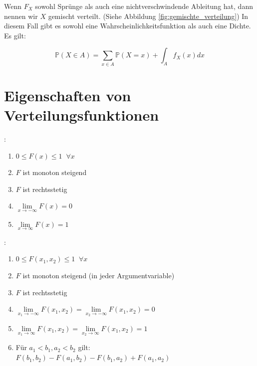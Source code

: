 {    Wenn $F_{X}$ sowohl Sprünge als auch eine nichtverschwindende Ableitung hat, dann nennen wir $X$ gemischt verteilt. (Siehe Abbildung \ref{fig:gemischte_verteilung})
    In diesem Fall gibt es sowohl eine Wahrscheinlichkeitsfunktion als auch eine Dichte. Es gilt:

    \[
    \mathbb P\left(X\in A\right)=\sum _{x\in A}{\mathbb P\left(X=x\right)}+\int_{A}{f_{X}(x)}dx
    \]



    \section{Eigenschaften von Verteilungsfunktionen}

    \begin{definition}:\\
    \label{def:verteilungsfunktion_eigenschaften}
    \begin{enumerate}[1)]
        \item  $0\le F\left(x\right)\le 1\;\;\forall x$
        \item  $F$ ist monoton steigend
        \item $F$ ist rechtsstetig
        \item $\lim\limits_{x\rightarrow-\infty}F(x)=0$
        \item $\lim\limits_{x\rightarrow\infty}F(x)=1$
    \end{enumerate}
    \end{definition}

    \begin{definition}:\\
    \begin{enumerate}[1)]
        \item  $0\le F\left(x_1,x_2\right)\le 1\;\;\forall x$
        \item  $F$ ist monoton steigend (in jeder Argumentvariable)
        \item $F$ ist rechtsstetig
        \item $\lim\limits_{x_1\rightarrow-\infty}F(x_1,x_2)=\lim\limits_{x_2\rightarrow-\infty}F(x_1,x_2)=0$
        \item $\lim\limits_{x_1\rightarrow\infty}F(x_1,x_2)=\lim\limits_{x_2\rightarrow\infty}F(x_1,x_2)=1$
        \item Für $a_{1}<b_{1},a_{2}<b_{2}$ gilt:\label{itm:vert_eigenschaft}\\
        $F\left(b_{1},b_{2}\right)-F\left(a_{1},b_{2}\right)-F\left(b_{1},a_{2}\right)+F(a_{1},a_{2})$
    \end{enumerate}
    \end{definition}

}
